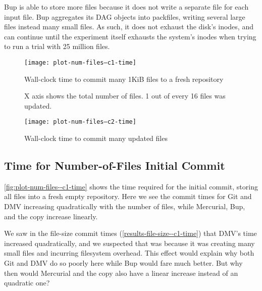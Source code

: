 Bup is able to store more files because it does not write a separate file for
each input file. Bup aggregates its DAG objects into \glspl{packfile}, writing
several large files instead many small files. As such, it does not exhaust the
disk's \glspl{inode}, and can continue until the experiment itself exhausts the
system's \glspl{inode} when trying to run a trial with \num{25} million files.

%

\begin{figure}[p]
    \begin{leftfullpage}
        \caption{Wall-clock time to commit many 1KiB files to a fresh repository}
        \label{fig:plot-num-files--c1-time}
        \centering

        \explainlogsubfig

        \texttt{[image: plot-num-files--c1-time]}
    \end{leftfullpage}
\end{figure}

\begin{figure}[p]
    \begin{leftfullpage}
        \caption{Wall-clock time to commit many updated files}
        \label{fig:plot-num-files--c2-time}
        \centering

        X axis shows the total number of files. 1 out of every 16 files was updated.
        \explainlogsubfig

        \texttt{[image: plot-num-files--c2-time]}
    \end{leftfullpage}
\end{figure}

\cleardoublepage

\subsection{Time for Number-of-Files Initial Commit}
\label{results-num-files--c1-time}

\autoref{fig:plot-num-files--c1-time} shows the time required for the initial
\gls{commit}, storing all files into a fresh empty \gls{repository}. Here we see
the commit times for Git and DMV increasing quadratically with the number of
files, while Mercurial, Bup, and the copy increase linearly.

We saw in the file-size commit times (\autoref{results-file-size--c1-time}) that
DMV's time increased quadratically, and we suspected that was because it was
creating many small files and incurring filesystem overhead. This effect would
explain why both Git and DMV do so poorly here while Bup would fare much better.
But why then would Mercurial and the copy also have a linear increase instead of
an quadratic one?

